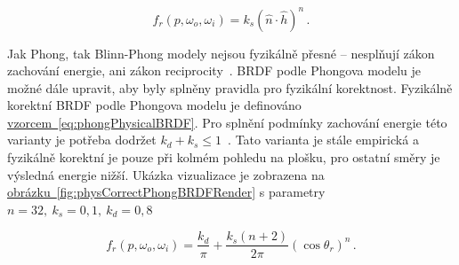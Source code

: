 \documentclass[czech,master]{diploma}
\newcommand{\uvec}[1]{\hat{#1}}
\newcommand{\point}{p}
\newcommand{\brdf}{f_r\left(\point,\omega_{o},\omega_{i}\right)}
\newcommand{\normVec}{\uvec{n}}
\newcommand{\halfVec}{\uvec{h}}
\begin{document}
\begin{equation} \label{eq:blinnBRDF}
  \brdf = k_s{(\normVec\cdot\halfVec)}^{n}\,.
\end{equation}

Jak Phong, tak Blinn-Phong modely nejsou fyzikálně přesné -- nesplňují zákon zachování energie, ani zákon reciprocity~\cite{BRDFOverview}. BRDF podle Phongova modelu je možné dále upravit, aby byly splněny pravidla pro fyzikální korektnost. Fyzikálně korektní BRDF podle Phongova modelu je definováno \hyperref[eq:phongPhysicalBRDF]{vzorcem~\ref{eq:phongPhysicalBRDF}}. Pro splnění podmínky zachování energie této varianty je potřeba dodržet \(k_d + k_s \leq 1\)~\cite{LaFortunePhongBRDF}. Tato varianta je stále empirická a fyzikálně korektní je pouze při kolmém pohledu na plošku, pro ostatní směry je výsledná energie nižší. Ukázka vizualizace je zobrazena na \hyperref[fig:physCorrectPhongBRDFRender]{obrázku~\ref{fig:physCorrectPhongBRDFRender}} s parametry \(n = 32, ~k_s = 0{,}1,~k_d = 0{,}8\)

\begin{equation} \label{eq:phongPhysicalBRDF}
  \brdf = \frac{k_d}{\pi} +
  \frac{k_s\left(n+2\right)}{2\pi}{\left(\cos\theta_r\right)}^{n}\,.
\end{equation}
\end{document}
